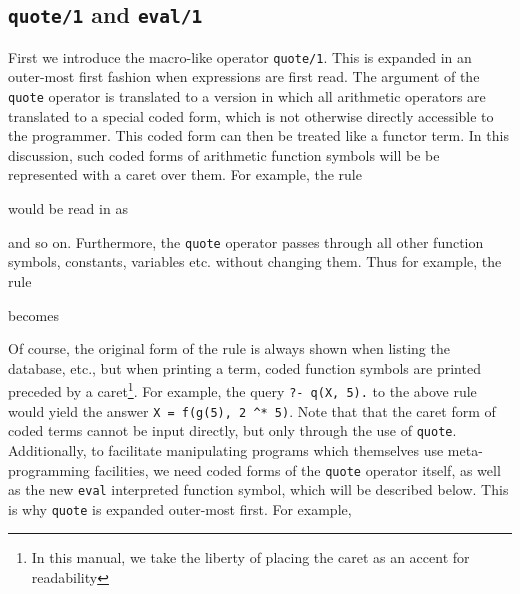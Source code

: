 \subsection{{\tt quote/1} and {\tt eval/1}}

First we introduce the macro-like operator 
{\tt quote/1}. 
This is expanded in an outer-most first
fashion when expressions are first read. 
The argument of the {\tt quote} operator is translated to a version in 
which all arithmetic operators are translated to a special coded form, 
which is not otherwise directly accessible to the programmer. 
This coded form can then be treated like a functor term.
In this discussion, such coded forms of arithmetic function 
symbols will be be represented with a caret over them. 
For example, the rule


\noindent
would be read in as


\noindent
and so on. Furthermore, the {\tt quote} operator passes through all other
function symbols, constants, variables etc. without changing them. Thus for
example, the rule


\noindent
becomes


\noindent
Of course, the original form of the rule is always shown when listing the
database, etc., but when printing a term, coded function symbols  
are printed preceded by a caret\footnote{
In this manual, we take the liberty of placing the caret as
an accent for readability}. 
For example,
the query {\tt ?- q(X, 5).} to the above rule would yield the answer 
{\tt X = f(g(5), 2 \^{}* 5)}. 
Note that that the caret form of coded terms cannot be input directly,
but only through the use of {\tt quote}. 
Additionally, to facilitate manipulating programs which themselves use
meta-programming facilities, we need coded forms of the {\tt quote} operator
itself, as well as the new {\tt eval} interpreted function symbol, 
which will be described below. 
This is why {\tt quote} is expanded outer-most first. For example, 


